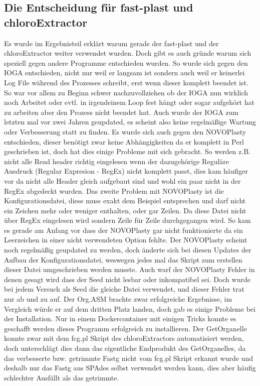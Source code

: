 \documentclass{scrartcl}
\begin{document}
\subsection{Die Entscheidung für fast-plast und chloroExtractor}
\label{sec-5-2}
Es wurde im Ergebnisteil erklärt warum gerade der fast-plast und der chloroExtractor weiter verwendet wurden. Doch gibt es auch gründe warum sich speziell gegen andere Programme entschieden wurden. 
So wurde sich gegen den IOGA entschieden, nicht nur weil er langsam ist sondern auch weil er keinerlei Log File während des Prozesses schreibt, erst wenn dieser komplett beendet ist. So war vor allem zu Beginn 
 schwer nachzuvollziehen ob der IOGA nun wirklich noch Arbeitet oder evtl. in irgendeinem Loop fest hängt oder sogar aufgehört hat zu arbeiten aber den Prozess nicht beendet hat. Auch wurde der IOGA zum letzten mal 
vor zwei Jahren geupdated, es scheint also keine regelmäßige Wartung oder Verbesserung statt zu finden. Es wurde sich auch gegen den NOVOPlasty entschieden, dieser benötigt zwar keine Abhängigkeiten da er komplett 
in Perl geschrieben ist, doch hat dies einige Probleme mit sich gebracht. So werden z.B. nicht alle Read header richtig eingelesen wenn der dazugehörige Reguläre Ausdruck (Regular Expresion - RegEx) nicht komplett passt, dies kam häufiger 
vor da nicht alle Header gleich aufgebaut sind und wohl ein paar nicht in der RegEx abgedeckt wurden. Das zweite Problem mit NOVOPlasty ist die Konfigurationsdatei, diese muss exakt dem Beispiel entsprechen und darf nicht ein Zeichen mehr
oder weniger enthalten, oder gar Zeilen. Da diese Datei nicht über RegEx eingelesen wird sondern Zeile für Zeile durchgegangen wird. So kam es gerade am Anfang vor dass der NOVOPlasty gar nicht funktionierte da ein Leerzeichen 
in einer nicht verwendeten Option fehlte. Der NOVOPlasty scheint noch regelmäßig geupdated zu werden, doch änderte sich bei diesen Updates der Aufbau der Konfigurationsdatei, weswegen jedes mal das Skript zum erstellen dieser
Datei umgeschrieben werden musste. Auch warf der NOVOPlasty Fehler in denen gesagt wird dass der Seed nicht lesbar oder inkompatibel sei. Doch wurde bei jedem Versuch als Seed die gleiche Datei verwendet, und dieser Fehler trat nur ab und zu auf.
Der Org.ASM brachte zwar erfolgreiche Ergebnisse, im Vergleich würde er auf dem dritten Platz landen, doch gab es einige Probleme bei der Installation. Nur in einem
Dockercontainer mit einigen Tricks konnte es geschafft werden dieses Programm erfolgreich zu installieren. Der GetOrganelle konnte zwar mit dem fcg.pl Skript des chloroExtractors automatisiert werden, doch unterschlägt
dies dann das eigentliche Endprodukt des GetOrganelles, da das verbesserte bzw. getrimmte Fastg nicht vom fcg.pl Skript erkannt wurde und deshalb nur das Fastg aus SPAdes selbst verwendet werden kann, dies aber häufig schlechter
Ausfällt als das getrimmte. 
\end{document}
